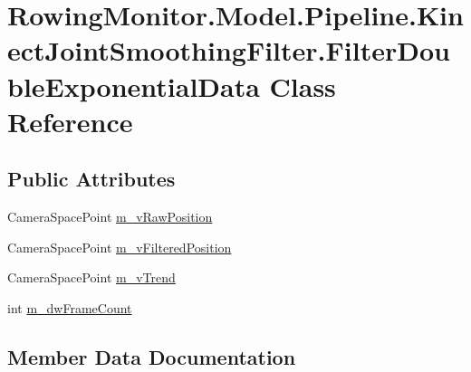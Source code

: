 \hypertarget{class_rowing_monitor_1_1_model_1_1_pipeline_1_1_kinect_joint_smoothing_filter_1_1_filter_double_exponential_data}{}\section{Rowing\+Monitor.\+Model.\+Pipeline.\+Kinect\+Joint\+Smoothing\+Filter.\+Filter\+Double\+Exponential\+Data Class Reference}
\label{class_rowing_monitor_1_1_model_1_1_pipeline_1_1_kinect_joint_smoothing_filter_1_1_filter_double_exponential_data}
\subsection*{Public Attributes}
\begin{DoxyCompactItemize}
\item 
Camera\+Space\+Point \hyperlink{class_rowing_monitor_1_1_model_1_1_pipeline_1_1_kinect_joint_smoothing_filter_1_1_filter_double_exponential_data_aaa96edf113418068d2dc5e9ae97400ea}{m\+\_\+v\+Raw\+Position}
\item 
Camera\+Space\+Point \hyperlink{class_rowing_monitor_1_1_model_1_1_pipeline_1_1_kinect_joint_smoothing_filter_1_1_filter_double_exponential_data_a21b62353676c1da09291ff22fc273e19}{m\+\_\+v\+Filtered\+Position}
\item 
Camera\+Space\+Point \hyperlink{class_rowing_monitor_1_1_model_1_1_pipeline_1_1_kinect_joint_smoothing_filter_1_1_filter_double_exponential_data_a59e5535cdc6f5edb7dd8d6a3b37fa9cf}{m\+\_\+v\+Trend}
\item 
int \hyperlink{class_rowing_monitor_1_1_model_1_1_pipeline_1_1_kinect_joint_smoothing_filter_1_1_filter_double_exponential_data_a6e78b9e396880ae02df6ed4a22ef8d5a}{m\+\_\+dw\+Frame\+Count}
\end{DoxyCompactItemize}


\subsection{Member Data Documentation}
\mbox{\label{class_rowing_monitor_1_1_model_1_1_pipeline_1_1_kinect_joint_smoothing_filter_1_1_filter_double_exponential_data_a6e78b9e396880ae02df6ed4a22ef8d5a}} 
